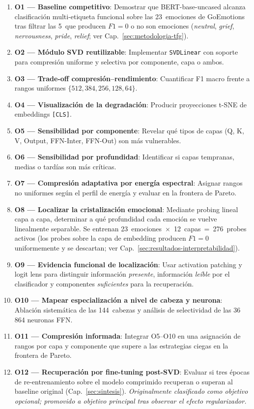 \begin{enumerate}[nosep]
    \item \textbf{O1 --- Baseline competitivo}: Demostrar que
    BERT-base-uncased alcanza clasificación multi-etiqueta funcional
    sobre las 23~emociones de GoEmotions tras filtrar las 5~que
    producen $F1=0$ o no son emociones (\emph{neutral}, \emph{grief},
    \emph{nervousness}, \emph{pride}, \emph{relief}; ver
    Cap.~\ref{sec:metodologia-tfg}).
    \item \textbf{O2 --- Módulo SVD reutilizable}: Implementar
    \texttt{SVDLinear} con soporte para compresión uniforme y selectiva
    por componente, capa o ambos.
    \item \textbf{O3 --- Trade-off compresión--rendimiento}: Cuantificar
    F1 macro frente a rangos uniformes $\{512, 384, 256, 128, 64\}$.
    \item \textbf{O4 --- Visualización de la degradación}: Producir
    proyecciones t-SNE de embeddings \texttt{[CLS]}.
    \item \textbf{O5 --- Sensibilidad por componente}: Revelar qué
    tipos de capas (Q, K, V, Output, FFN-Inter, FFN-Out) son más
    vulnerables.
    \item \textbf{O6 --- Sensibilidad por profundidad}: Identificar si
    capas tempranas, medias o tardías son más críticas.
    \item \textbf{O7 --- Compresión adaptativa por energía espectral}:
    Asignar rangos no uniformes según el perfil de energía y evaluar
    en la frontera de Pareto.
    \item \textbf{O8 --- Localizar la cristalización emocional}:
    Mediante probing lineal capa a capa, determinar a qué profundidad
    cada emoción se vuelve linealmente separable. Se entrenan
    23~emociones~$\times$~12~capas~=~276~probes activos (los probes
    sobre la capa de embedding producen $F1=0$ uniformemente y se
    descartan; ver Cap.~\ref{sec:resultados-interpretabilidad}).
    \item \textbf{O9 --- Evidencia funcional de localización}: Usar
    activation patching y logit lens para distinguir información
    \emph{presente}, información \emph{leíble} por el clasificador y
    componentes \emph{suficientes} para la recuperación.
    \item \textbf{O10 --- Mapear especialización a nivel de cabeza y
    neurona}: Ablación sistemática de las 144~cabezas y análisis de
    selectividad de las 36\,864 neuronas FFN.
    \item \textbf{O11 --- Compresión informada}: Integrar O5--O10 en
    una asignación de rangos por capa y componente que supere a las
    estrategias ciegas en la frontera de Pareto.
    \item \textbf{O12 --- Recuperación por fine-tuning post-SVD}:
    Evaluar si tres épocas de re-entrenamiento sobre el modelo
    comprimido recuperan o superan al baseline original
    (Cap.~\ref{sec:sintesis}). \emph{Originalmente clasificado como
    objetivo opcional; promovido a objetivo principal tras observar el
    efecto regularizador.}
\end{enumerate}

